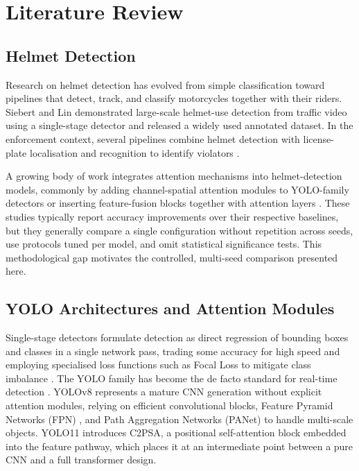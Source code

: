\documentclass[conference]{IEEEtran}
\begin{document}
\section{Literature Review}

\subsection{Helmet Detection}

Research on helmet detection has evolved from simple classification toward pipelines that detect, track, and classify motorcycles together with their riders. Siebert and Lin \cite{ref1} demonstrated large-scale helmet-use detection from traffic video using a single-stage detector and released a widely used annotated dataset. In the enforcement context, several pipelines combine helmet detection with license-plate localisation and recognition to identify violators \cite{ref4, ref_helmet_recent, ref_helmet_cctv}.

A growing body of work integrates attention mechanisms into helmet-detection models, commonly by adding channel-spatial attention modules to YOLO-family detectors or inserting feature-fusion blocks together with attention layers \cite{ref19, ref20}. These studies typically report accuracy improvements over their respective baselines, but they generally compare a single configuration without repetition across seeds, use protocols tuned per model, and omit statistical significance tests. This methodological gap motivates the controlled, multi-seed comparison presented here.

\subsection{YOLO Architectures and Attention Modules}

Single-stage detectors formulate detection as direct regression of bounding boxes and classes in a single network pass, trading some accuracy for high speed and employing specialised loss functions such as Focal Loss \cite{ref_focalloss} to mitigate class imbalance \cite{ref5}. The YOLO family has become the de facto standard for real-time detection \cite{ref_terven}. YOLOv8 represents a mature CNN generation without explicit attention modules, relying on efficient convolutional blocks, Feature Pyramid Networks (FPN) \cite{ref_fpn}, and Path Aggregation Networks (PANet) \cite{ref_panet} to handle multi-scale objects. YOLO11 introduces C2PSA, a positional self-attention block embedded into the feature pathway, which places it at an intermediate point between a pure CNN and a full transformer design.
\end{document}
